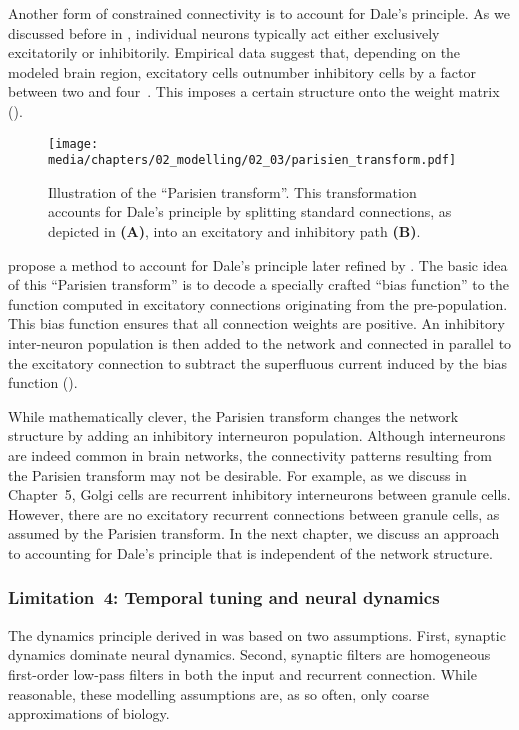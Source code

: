 Another form of constrained connectivity is to account for Dale's principle.
As we discussed before in , individual neurons typically act either exclusively excitatorily or inhibitorily. Empirical data suggest that, depending on the modeled brain region, excitatory cells outnumber inhibitory cells by a factor between two and four~\citep{hendry1981sizes,gabbott1986quantitative}.
This imposes a certain structure onto the weight matrix ().

\begin{figure}
	\centering
	\texttt{[image: media/chapters/02\_modelling/02\_03/parisien\_transform.pdf]}
	\caption[Illustration of the \enquote{Parisien transform}]{Illustration of the \enquote{Parisien transform}. This transformation accounts for Dale's principle by splitting standard \NEF connections, as depicted in \textbf{(A)}, into an excitatory and inhibitory path \textbf{(B)}.}
	\label{fig:parisien_transform}
\end{figure}

 propose a method to account for Dale's principle later refined by \citet{parisien2008solving}.
The basic idea of this \enquote{Parisien transform} is to decode a specially crafted \enquote{bias function} to the function computed in excitatory connections originating from the pre-population.
This bias function ensures that all connection weights are positive.
An inhibitory inter-neuron population is then added to the network and connected in parallel to the excitatory connection to subtract the superfluous current induced by the bias function ().

While mathematically clever, the Parisien transform changes the network structure by adding an inhibitory interneuron population.
Although interneurons are indeed common in brain networks, the connectivity patterns resulting from the Parisien transform may not be desirable.
For example, as we discuss in Chapter~5, Golgi cells are recurrent inhibitory interneurons between granule cells.
However, there are no excitatory recurrent connections between granule cells, as assumed by the Parisien transform.
In the next chapter, we discuss an approach to accounting for Dale's principle that is independent of the network structure.

\subsubsection{Limitation~4: Temporal tuning and neural dynamics}
The dynamics principle derived in  was based on two assumptions.
First, synaptic dynamics dominate neural dynamics.
Second, synaptic filters are homogeneous first-order low-pass filters in both the input and recurrent connection.
While reasonable, these modelling assumptions are, as so often, only coarse approximations of biology.

